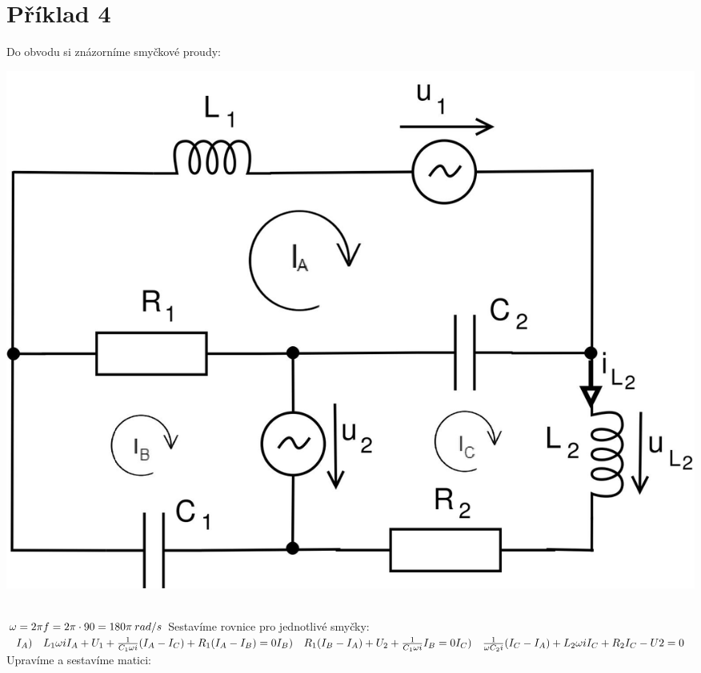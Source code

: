 \section{Příklad 4}
\newline
\Large{Do obvodu si znázorníme smyčkové proudy:}
\begin{center}
    \includegraphics[scale=0.6,keepaspectratio]{fig/Pr4Arrows.jpg}
\end{center}
\newpage
{}\\
\begin{math}
\newline
    \omega = 2\pi f = 2\pi \cdot 90 = 180\pi\:rad/s\\\\
\end{math}
\Large{Sestavíme rovnice pro jednotlivé smyčky:}\\
\begin{math}
\newline
    I_A)\quad L_1\omega i I_A + U_1 + \frac{1}{C_1\omega i}(I_A-I_C) + R_1(I_A-I_B) = 0\\
    I_B)\quad R_1(I_B-I_A)+U_2+\frac{1}{C_1\omega i}I_B = 0\\
    I_C)\quad \frac{1}{\omega C_2 i}(I_C-I_A)+L_2\omega iI_C+R_2I_C-U2=0\\ \\
\end{math}
\Large{Upravíme a sestavíme matici:}\\

